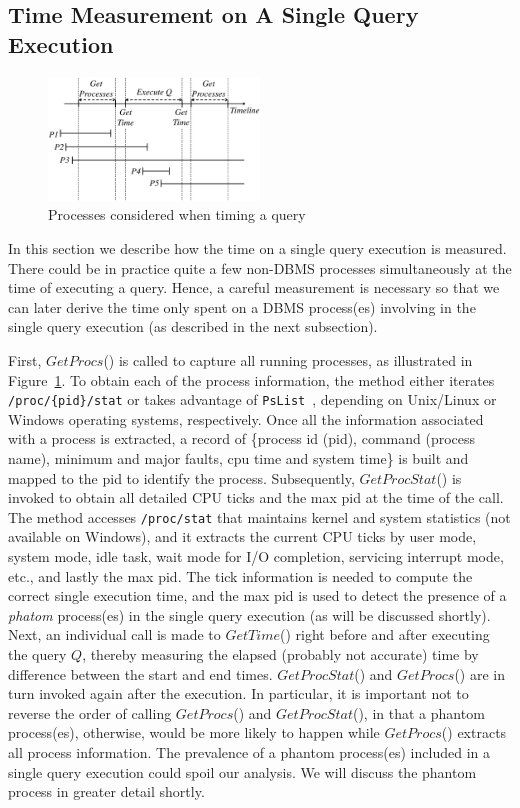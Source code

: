 \subsection{Time Measurement on A Single Query Execution}\label{sec:measure_time}

\begin{figure}[th]\centering
\includegraphics[width=0.50\textwidth]{figures/time_measurement.eps}
\caption{Processes considered when timing a query\label{fig:timing}}
\end{figure}

In this section we describe how the time on a single query execution 
is measured. 
There could be in practice quite a few non-DBMS processes simultaneously 
at the time of executing a query. 
Hence, a careful measurement is necessary so that we can later derive 
the time only spent on a DBMS process(es) involving in the single 
query execution (as described in the next subsection). 

First, $GetProcs$() is called to capture all running processes, 
as illustrated in Figure~\ref{fig:timing}. 
To obtain each of the process information, 
the method either iterates {\tt /proc/\{pid\}/stat} or 
takes advantage of {\tt PsList}~\cite{russinovich10}, depending on Unix/Linux 
or Windows operating systems, respectively. 
Once all the information associated with a process 
is extracted, a record of \{process id (pid), command (process name), 
minimum and major faults, cpu time and system time\} is built and mapped 
to the pid to identify the process. 
Subsequently, $GetProcStat$() is invoked to obtain all detailed CPU ticks and 
the max pid at the time of the call. 
The method accesses {\tt /proc/stat} that maintains kernel and system statistics 
(not available on Windows), and it extracts the current 
CPU ticks by user mode, system mode, idle task, wait mode for I/O completion, 
servicing interrupt mode, etc., and lastly the max pid.
The tick information is needed to compute the correct single execution time, 
and the max pid is used to detect the presence of a 
{\em phatom} process(es) in the single query execution (as will be discussed shortly). 
Next, an individual call is made to $GetTime$() right before and 
after executing the query $Q$, thereby measuring the elapsed 
(probably not accurate) time by difference between the start and end times. 
$GetProcStat$() and $GetProcs$() are in turn invoked again after the execution. 
In particular, it is important not to reverse the order of calling 
$GetProcs$() and $GetProcStat$(), in that a phantom process(es), otherwise, 
would be more likely to happen while $GetProcs$() extracts all process information. 
The prevalence of a phantom process(es) included in a single query execution 
could spoil our analysis. 
We will discuss the phantom process in greater detail shortly. 

